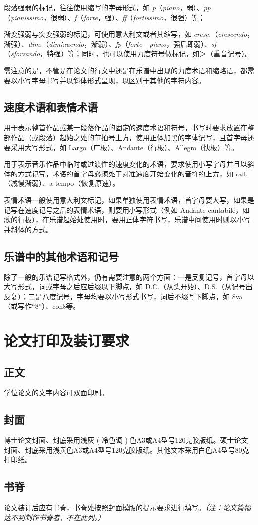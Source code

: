 段落强弱的标记，往往使用缩写的字母形式，如 \textit{p}（\textit{piano}，弱）、\textit{pp}（\textit{pianissimo}，很弱）、\textit{f}（\textit{forte}，强）、\textit{ff}（\textit{fortissimo}，很强）等；

渐变强弱与突变强弱的标记，可使用意大利文或者其缩写，如 \textit{cresc.}（\textit{crescendo}，渐强）、\textit{dim.}（\textit{diminuendo}，渐弱）、\textit{fp}（\textit{forte - piano}，强后即弱）、\textit{sf}（\textit{sforzando}，特强）等；同时，也可以使用力度符号做标记，如＞（重音记号）。

需注意的是，不管是在论文的行文中还是在乐谱中出现的力度术语和缩略语，都需要以小写字母书写并以斜体形式呈现，以区别于其他的字符内容。

\subsection{速度术语和表情术语}

用于表示整首作品或某一段落作品的固定的速度术语和符号，书写时要求放置在整部作品（或段落）起始之处的节拍号上方，使用正体加黑的字体记写，且首字母还要采用大写形式，如 Largo（广板）、Andante（行板）、Allegro（快板）等。

用于表示音乐作品中临时或过渡性的速度变化的术语，要求使用小写字母并且以斜体的方式记写，术语的首字母必须处于对准速度开始变化的音符的上方，如 rall.（减慢渐弱）、a tempo（恢复原速）。

表情术语一般使用意大利文标记，如果单独使用表情术语，首字母要大写，如果是记写在速度记号之后的表情术语，则要用小写形式（例如 Andante cantabile，如歌的行板），在乐谱起始处使用时，要用正体字符书写，乐谱中间使用时则以小写并斜体的方式。

\subsection{乐谱中的其他术语和记号}

除了一般的乐谱记写格式外，仍有需要注意的两个方面：一是反复记号，首字母以大写形式，词或字母之后应后缀以下脚点，如 D.C.（从头开始）、D.S.（从记号出反复）；二是八度记号，字母均要以小写形式书写，词后不缀写下脚点，如 8va（或写作“8”）、con8等。

\section{论文打印及装订要求}

\subsection{正文}

学位论文的文字内容可双面印刷。

\subsection{封面}

博士论文封面、封底采用浅灰 ( 冷色调 ) 色A3或A4型号120克胶版纸。硕士论文封面、封底采用浅黄色A3或A4型号120克胶版纸。其他文本采用白色A4型号80克打印纸。

\subsection{书脊}

论文装订后应有书脊，书脊处按照封面模版的提示要求进行填写。\textit{（注：论文篇幅达不到制作书脊者，不在此列。）}
